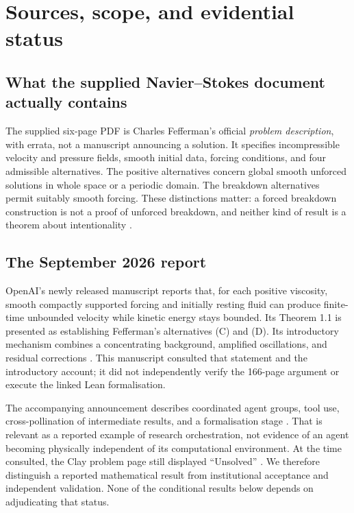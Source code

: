 \documentclass[11pt,a4paper]{article}
\theoremstyle{definition}
\theoremstyle{remark}
\begin{document}
\section{Sources, scope, and evidential status}\label{sec:sources}
\subsection{What the supplied Navier--Stokes document actually contains}
The supplied six-page PDF is Charles Fefferman's official \emph{problem description}, with errata, not a manuscript announcing a solution. It specifies incompressible velocity and pressure fields, smooth initial data, forcing conditions, and four admissible alternatives. The positive alternatives concern global smooth unforced solutions in whole space or a periodic domain. The breakdown alternatives permit suitably smooth forcing. These distinctions matter: a forced breakdown construction is not a proof of unforced breakdown, and neither kind of result is a theorem about intentionality \citep{fefferman}.

\subsection{The September 2026 report}
OpenAI's newly released manuscript reports that, for each positive viscosity, smooth compactly supported forcing and initially resting fluid can produce finite-time unbounded velocity while kinetic energy stays bounded. Its Theorem 1.1 is presented as establishing Fefferman's alternatives (C) and (D). Its introductory mechanism combines a concentrating background, amplified oscillations, and residual corrections \citep{openains}. This manuscript consulted that statement and the introductory account; it did not independently verify the 166-page argument or execute the linked Lean formalisation.

The accompanying announcement describes coordinated agent groups, tool use, cross-pollination of intermediate results, and a formalisation stage \citep{openaiannounce}. That is relevant as a reported example of research orchestration, not evidence of an agent becoming physically independent of its computational environment. At the time consulted, the Clay problem page still displayed ``Unsolved'' \citep{claystatus}. We therefore distinguish a reported mathematical result from institutional acceptance and independent validation. None of the conditional results below depends on adjudicating that status.
\end{document}
